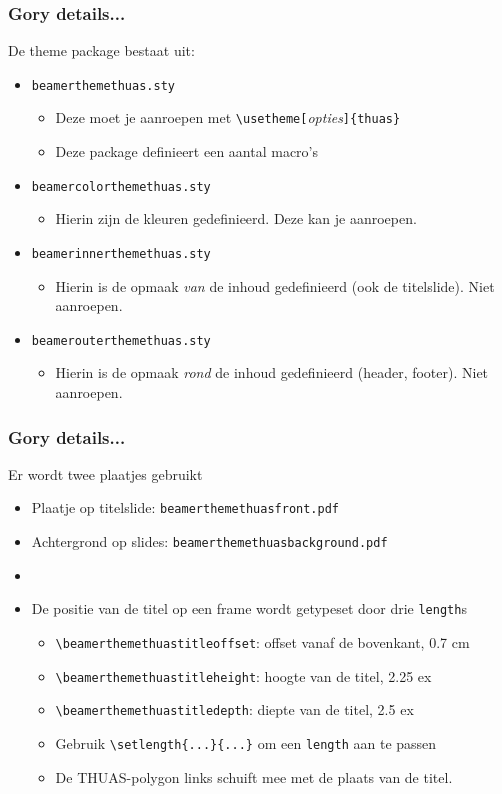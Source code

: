 \documentclass[fleqn,aspectratio=169,dutch,10pt]{beamer}
\begin{document}
\begin{frame}[fragile]
\frametitle{Gory details...}
De theme package bestaat uit:
\begin{itemize}
\item \texttt{beamerthemethuas.sty}
\begin{itemize}
\item Deze moet je aanroepen met \lstinline|\usetheme[|\textsl{opties}\lstinline|]{thuas}|
\item Deze package definieert een aantal macro's
\end{itemize}
\item \texttt{beamercolorthemethuas.sty}
\begin{itemize}
\item Hierin zijn de kleuren gedefinieerd. Deze kan je aanroepen.
\end{itemize}
\item \texttt{beamerinnerthemethuas.sty}
\begin{itemize}
\item Hierin is de opmaak \emph{van} de inhoud gedefinieerd (ook de titelslide). Niet aanroepen.
\end{itemize}
\item \texttt{beamerouterthemethuas.sty}
\begin{itemize}
\item Hierin is de opmaak \emph{rond} de inhoud gedefinieerd (header, footer). Niet aanroepen.
\end{itemize}
\end{itemize}
\end{frame}


\begin{frame}[fragile]
\frametitle{Gory details...}
Er wordt twee plaatjes gebruikt
\begin{itemize}
\item Plaatje op titelslide: \lstinline|beamerthemethuasfront.pdf|
\item Achtergrond op slides: \lstinline|beamerthemethuasbackground.pdf|
\item []
\item De positie van de titel op een frame wordt getypeset door drie \lstinline|length|s
\begin{itemize}
\item \lstinline|\beamerthemethuastitleoffset|: offset vanaf de bovenkant, 0.7 cm
\item \lstinline|\beamerthemethuastitleheight|: hoogte van de titel, 2.25 ex
\item \lstinline|\beamerthemethuastitledepth|: diepte van de titel, 2.5 ex
\item Gebruik \lstinline|\setlength{...}{...}| om een \lstinline|length| aan te passen
\item De THUAS-polygon links schuift mee met de plaats van de titel.
\end{itemize}
\end{itemize}
\end{frame}
\end{document}

